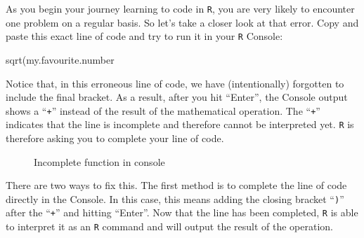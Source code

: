 \documentclass[
  letterpaper,
  DIV=11,
  numbers=noendperiod]{scrreprt}
\newenvironment{Shaded}{\begin{snugshade}}{\end{snugshade}}
\newcommand{\FunctionTok}[1]{\textcolor[rgb]{0.28,0.35,0.67}{#1}}
\newcommand{\NormalTok}[1]{\textcolor[rgb]{0.00,0.23,0.31}{#1}}
\begin{document}
As you begin your journey learning to code in \texttt{R}, you are very
likely to encounter one problem on a regular basis. So let's take a
closer look at that error. Copy and paste this exact line of code and
try to run it in your \texttt{R} Console:

\begin{Shaded}
\begin{Highlighting}[]
\FunctionTok{sqrt}\NormalTok{(my.favourite.number}
\end{Highlighting}
\end{Shaded}

Notice that, in this erroneous line of code, we have (intentionally)
forgotten to include the final bracket. As a result, after you hit
``Enter'', the Console output shows a ``\texttt{+}'' instead of the
result of the mathematical operation. The ``\texttt{+}'' indicates that
the line is incomplete and therefore cannot be interpreted yet.
\texttt{R} is therefore asking you to complete your line of code.

\begin{figure}


\caption{\label{fig-ConsoleUncompleteFunction}Incomplete function in
console}

\end{figure}%

There are two ways to fix this. The first method is to complete the line
of code directly in the Console. In this case, this means adding the
closing bracket ``\texttt{)}'' after the ``\texttt{+}'' and hitting
``Enter''. Now that the line has been completed, \texttt{R} is able to
interpret it as an \texttt{R} command and will output the result of the
operation.
\end{document}

